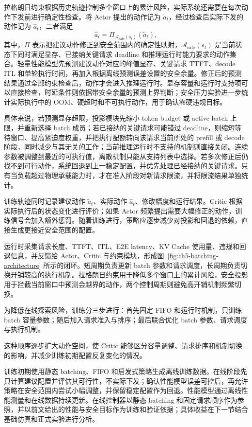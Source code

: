 拉格朗日约束根据历史轨迹控制多个窗口上的累计风险，实际系统还需要在每次动作下发前进行确定性检查。将 Actor 提出的动作记为 \(\widetilde a_t\)，经过检查后实际下发的动作记为 \(\widehat a_t\)，二者满足
\[
\widehat a_t=\Pi_{\mathcal A_{\mathrm{safe}}(s_t)}(\widetilde a_t),
\]
其中，\(\Pi\) 表示把建议动作修正到安全范围内的确定性映射，\(\mathcal A_{\mathrm{safe}}(s_t)\) 是当前状态下同时满足显存、已接纳关键请求 deadline 和推理运行时能力要求的动作集合。轻量性能模型先预测建议动作对应的峰值显存、关键请求 TTFT、decode ITL 和单轮执行时间，再加入根据离线预测误差设置的安全余量。修正后的预测结果通过全部约束检查后，动作才会进入推理运行时。显存容量和运行时支持项可以直接检查，时延条件则依据带安全余量的预测上界判断；安全压力实验进一步统计实际执行中的 OOM、硬超时和不可执行动作，用于确认零硬违规目标。

具体来说，若预测显存超限，投影模块先缩小 token budget 或 active batch 上限，并重新选择 batch 成员；若已接纳的关键请求可能错过 deadline，则缩短等待窗口、提高紧迫度权重，并把执行配额转向该请求当前所处的 prefill 或 decode 阶段，同时减少与其无关的工作；当前推理运行时不支持的机制则直接关闭。连续参数被调整到最近的可执行值，离散机制只能从支持列表中选择。若多次修正后仍找不到可行动作，系统回退到上一稳定配置，并优先处理已经接纳的关键请求。只有当负载超过物理承载能力时，才在准入阶段对新请求限流，并将限流结果单独统计。

训练轨迹同时记录建议动作 \(\widetilde a_t\)、实际动作 \(\widehat a_t\)、修改幅度和运行结果。Critic 根据实际执行后的状态变化进行评价；如果 Actor 频繁提出需要大幅修正的动作，训练信号会加入额外惩罚。随着训练进行，策略应逐步减少对投影和回退的依赖，直接生成更接近安全范围的配置。

运行时采集请求长度、TTFT、ITL、E2E latency、KV Cache 使用量、违规和回退信息，并反馈给 Actor、Critic 与约束模块，形成图~\ref{fig:ch5-batching-architecture} 所示的闭环。短周期负责更新 batch 参数和请求调度，长周期负责切换开销较高的执行机制。拉格朗日约束用于降低多个窗口上的累计风险，安全投影用于拦截当前窗口中预测会越界的动作，两个控制周期则避免高开销机制频繁切换。

为降低在线探索风险，训练分三步进行：首先固定 FIFO 和运行时机制，只训练 batch 容量参数；随后加入请求准入与排序；最后联合优化 batch 参数、请求调度与执行机制。

这种顺序逐步扩大动作空间，使 Critic 能够区分容量调整、请求排序和机制切换的影响，并减少训练初期配置反复变化的情况。

训练初期使用静态 batching、FIFO 和启发式策略生成离线训练数据。在线阶段先只计算建议配置并评估其可行性，不实际下发；确认性能模型误差可控后，再允许策略在安全范围内尝试小幅调整，并保留稳定配置作为回退。性能模型通过离线性能测量和在线数据持续更新。在线控制器以静态 batching 和固定请求顺序作为参照，并以前文给出的性能与安全目标作为训练和验证依据；具体收益在下一节结合基础仿真和正式实验进行分析。

